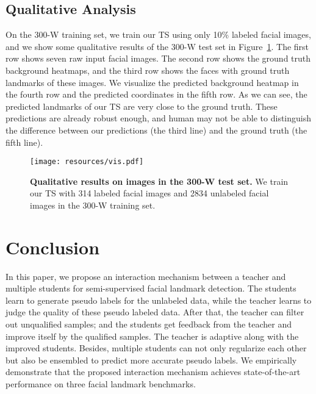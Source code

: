 \documentclass[10pt,twocolumn,letterpaper]{article}
\def\Figref#1{Figure~\ref{#1}}
\def\NAME{{{TS}}} \def\LLB{\textcolor{red}}
\begin{document}
\subsection{Qualitative Analysis}

On the 300-W training set, we train our {\NAME} using only 10\% labeled facial images, and we show some qualitative results of the 300-W test set in \Figref{fig:results}.
The first row shows seven raw input facial images.
The second row shows the ground truth background heatmaps, and the third row shows the faces with ground truth landmarks of these images.
We visualize the predicted background heatmap in the fourth row and the predicted coordinates in the fifth row.
As we can see, the predicted landmarks of our {\NAME} are very close to the ground truth.
These predictions are already robust enough, and human may not be able to distinguish the difference between our predictions (the third line) and the ground truth (the fifth line).



\begin{figure}[t]
\center
\texttt{[image: resources/vis.pdf]}
\caption{
\textbf{Qualitative results on images in the 300-W test set.}
We train our {\NAME} with 314 labeled facial images and 2834 unlabeled facial images in the 300-W training set.
}
\vspace{-2mm}
\label{fig:results}
\end{figure}


\section{Conclusion}

In this paper, we propose an interaction mechanism between a teacher and multiple students for semi-supervised facial landmark detection. The students learn to generate pseudo labels for the unlabeled data, while the teacher learns to judge the quality of these pseudo labeled data. After that, the teacher can filter out unqualified samples; and the students get feedback from the teacher and improve itself by the qualified samples. The teacher is adaptive along with the improved students. Besides, multiple students can not only regularize each other but also be ensembled to predict more accurate pseudo labels. We empirically demonstrate that the proposed interaction mechanism achieves state-of-the-art performance on three facial landmark benchmarks.


{\small


}
\end{document}
